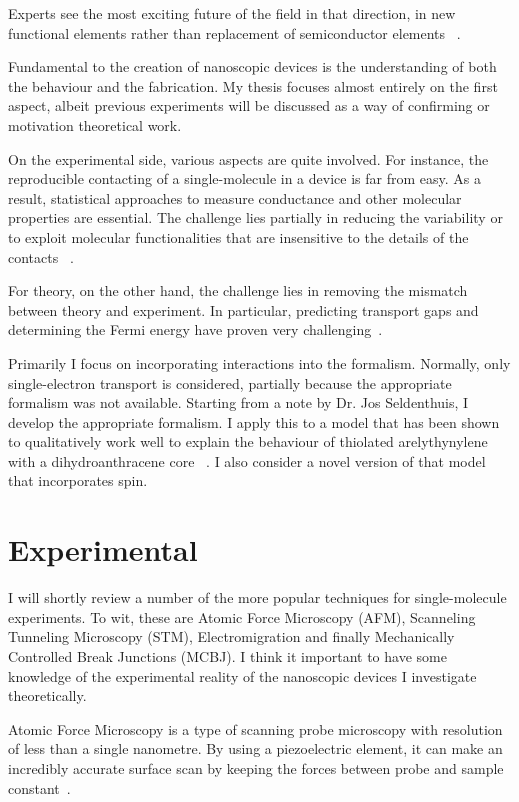 Experts see the most exciting future of the field in that direction, in new functional elements rather than replacement of semiconductor elements ~\cite{visions}.

Fundamental to the creation of nanoscopic devices is the understanding of both the behaviour and the fabrication. My thesis focuses almost entirely on the first aspect, albeit previous experiments will be discussed as a way of confirming or motivation theoretical work.

On the experimental side, various aspects are quite involved. For instance, the reproducible contacting of a single-molecule in a device is far from easy. As a result, statistical approaches to measure conductance and other molecular properties are essential. The challenge lies partially in reducing the variability or to exploit molecular functionalities that are insensitive to the details of the contacts ~\cite{visions}.

For theory, on the other hand, the challenge lies in removing the mismatch between theory and experiment. In particular, predicting transport gaps and determining the Fermi energy have proven very challenging~\cite{perrin}. 

Primarily I focus on incorporating interactions into the formalism. Normally, only single-electron transport is considered, partially because the appropriate formalism  was not available. Starting from a note by Dr. Jos Seldenthuis, I develop the appropriate formalism. I apply this to a model that has been shown to qualitatively work well to explain the behaviour of thiolated arelythynylene with a dihydroanthracene core ~\cite{perrinnano}. I also consider a novel version of that model that incorporates spin. 
\section{Experimental}
I will shortly review a number of the more popular techniques for single-molecule experiments. To wit, these are Atomic Force Microscopy (AFM), Scanneling Tunneling Microscopy (STM), Electromigration and finally Mechanically Controlled Break Junctions (MCBJ). I think it important to have some knowledge of the experimental reality of the nanoscopic devices I investigate theoretically.

Atomic Force Microscopy is a type of scanning probe microscopy with resolution of less than a single nanometre. By using a piezoelectric element, it can make an incredibly accurate surface scan by keeping the forces between probe and sample constant~\cite{frei1, frei2}.

